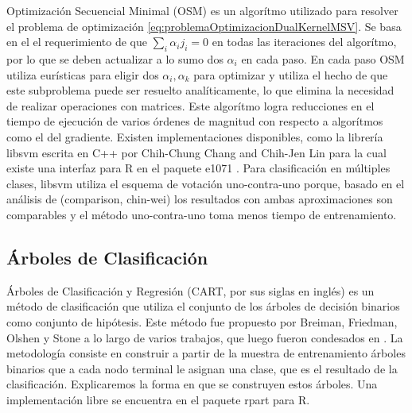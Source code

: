 \documentclass[letterpaper,12pt]{book}
\begin{document}
Optimización Secuencial Minimal (OSM) es un algorítmo utilizado para resolver el problema de optimización \ref{eq:problemaOptimizacionDualKernelMSV}. Se basa en el el requerimiento de que $\sum_i\alpha_ij_i = 0$ en todas las iteraciones del algorítmo, por lo que se deben actualizar a lo sumo dos $\alpha_i$ en cada paso. En cada paso OSM utiliza eurísticas para eligir dos $\alpha_i, \alpha_k$ para optimizar y utiliza el hecho de que este subproblema puede ser resuelto analíticamente, lo que elimina la necesidad de realizar operaciones con matrices. Este algorítmo logra reducciones en el tiempo de ejecución de varios órdenes de magnitud con respecto a algorítmos como el del gradiente. Existen implementaciones disponibles, como la librería libsvm escrita en C++ por Chih-Chung Chang and Chih-Jen Lin \cite{chang_libsvm:_2011} para la cual existe una interfaz para R en el paquete e1071 \cite{e1071}. Para clasificación en múltiples clases, libsvm utiliza el esquema de votación uno-contra-uno porque, basado en el análisis de (comparison, chin-wei) los resultados con ambas aproximaciones son comparables y el método uno-contra-uno toma menos tiempo de entrenamiento.

\subsection{Árboles de Clasificación}

Árboles de Clasificación y Regresión (CART, por sus siglas en inglés) es un método de clasificación que utiliza el conjunto de los árboles de decisión binarios como conjunto de hipótesis. Este método fue propuesto por Breiman, Friedman, Olshen y Stone a lo largo de varios trabajos, que luego fueron condesados en \cite{breiman_classification_1984}. La metodología consiste en construir a partir de la muestra de entrenamiento árboles binarios que a cada nodo terminal le asignan una clase, que es el resultado de la clasificación. Explicaremos la forma en que se construyen estos árboles. Una implementación libre se encuentra en el paquete rpart \cite{rpart} para R.
\end{document}
